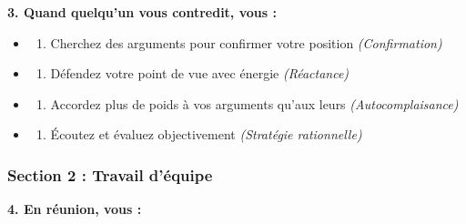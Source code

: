 \documentclass[
]{article}
\providecommand{\tightlist}{%
  \setlength{\itemsep}{0pt}\setlength{\parskip}{0pt}}
\begin{document}
\textbf{3. Quand quelqu'un vous contredit, vous :}

\begin{itemize}
\tightlist
\item
  \begin{enumerate}
  \def\labelenumi{\alph{enumi})}
  \tightlist
  \item
    Cherchez des arguments pour confirmer votre position
    \emph{(Confirmation)}
  \end{enumerate}
\item
  \begin{enumerate}
  \def\labelenumi{\alph{enumi})}
  \setcounter{enumi}{1}
  \tightlist
  \item
    Défendez votre point de vue avec énergie \emph{(Réactance)}
  \end{enumerate}
\item
  \begin{enumerate}
  \def\labelenumi{\alph{enumi})}
  \setcounter{enumi}{2}
  \tightlist
  \item
    Accordez plus de poids à vos arguments qu'aux leurs
    \emph{(Autocomplaisance)}
  \end{enumerate}
\item
  \begin{enumerate}
  \def\labelenumi{\alph{enumi})}
  \setcounter{enumi}{3}
  \tightlist
  \item
    Écoutez et évaluez objectivement \emph{(Stratégie rationnelle)}
  \end{enumerate}
\end{itemize}

\subsubsection{Section 2 : Travail
d'équipe}\label{section-2-travail-duxe9quipe}

\textbf{4. En réunion, vous :}
\end{document}

